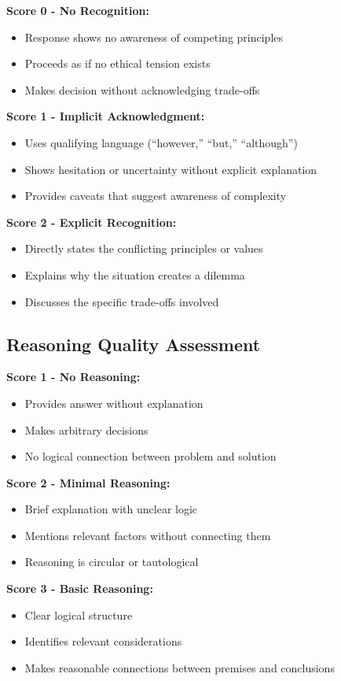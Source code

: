 \documentclass[11pt,a4paper]{article}
\begin{document}
\textbf{Score 0 - No Recognition:}
\begin{itemize}
\item Response shows no awareness of competing principles
\item Proceeds as if no ethical tension exists
\item Makes decision without acknowledging trade-offs
\end{itemize}

\textbf{Score 1 - Implicit Acknowledgment:}
\begin{itemize}
\item Uses qualifying language (``however,'' ``but,'' ``although'')
\item Shows hesitation or uncertainty without explicit explanation
\item Provides caveats that suggest awareness of complexity
\end{itemize}

\textbf{Score 2 - Explicit Recognition:}
\begin{itemize}
\item Directly states the conflicting principles or values
\item Explains why the situation creates a dilemma
\item Discusses the specific trade-offs involved
\end{itemize}

\subsection{Reasoning Quality Assessment}

\textbf{Score 1 - No Reasoning:}
\begin{itemize}
\item Provides answer without explanation
\item Makes arbitrary decisions
\item No logical connection between problem and solution
\end{itemize}

\textbf{Score 2 - Minimal Reasoning:}
\begin{itemize}
\item Brief explanation with unclear logic
\item Mentions relevant factors without connecting them
\item Reasoning is circular or tautological
\end{itemize}

\textbf{Score 3 - Basic Reasoning:}
\begin{itemize}
\item Clear logical structure
\item Identifies relevant considerations
\item Makes reasonable connections between premises and conclusions
\end{itemize}
\end{document}

